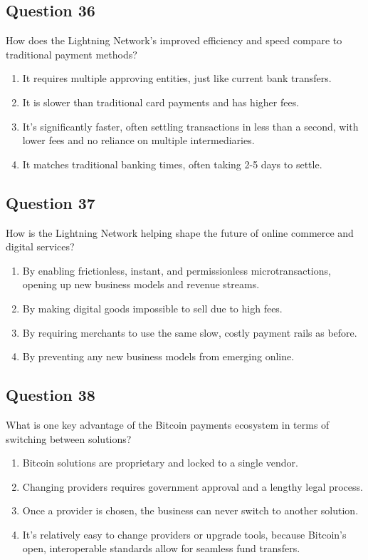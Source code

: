 \documentclass[12pt,a4paper]{article}
\begin{document}
\bigskip


\subsection*{Question 36}
How does the Lightning Network’s improved efficiency and speed compare to traditional payment methods?

\begin{enumerate}[label=\Alph*., leftmargin=*]
\item It requires multiple approving entities, just like current bank transfers.
\item It is slower than traditional card payments and has higher fees.
\item It’s significantly faster, often settling transactions in less than a second, with lower fees and no reliance on multiple intermediaries.
\item It matches traditional banking times, often taking 2-5 days to settle.
\end{enumerate}

\bigskip


\subsection*{Question 37}
How is the Lightning Network helping shape the future of online commerce and digital services?

\begin{enumerate}[label=\Alph*., leftmargin=*]
\item By enabling frictionless, instant, and permissionless microtransactions, opening up new business models and revenue streams.
\item By making digital goods impossible to sell due to high fees.
\item By requiring merchants to use the same slow, costly payment rails as before.
\item By preventing any new business models from emerging online.
\end{enumerate}

\bigskip


\subsection*{Question 38}
What is one key advantage of the Bitcoin payments ecosystem in terms of switching between solutions?

\begin{enumerate}[label=\Alph*., leftmargin=*]
\item Bitcoin solutions are proprietary and locked to a single vendor.
\item Changing providers requires government approval and a lengthy legal process.
\item Once a provider is chosen, the business can never switch to another solution.
\item It’s relatively easy to change providers or upgrade tools, because Bitcoin’s open, interoperable standards allow for seamless fund transfers.
\end{enumerate}
\end{document}
